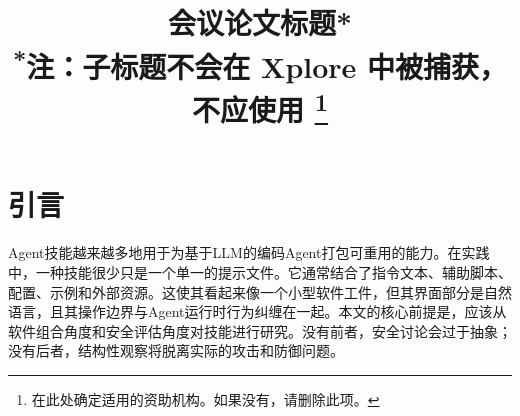 \documentclass[conference]{IEEEtran}
\begin{document}
\title{会议论文标题*\\
{\footnotesize \textsuperscript{*}注：子标题不会在 Xplore 中被捕获，不应使用}
\thanks{在此处确定适用的资助机构。如果没有，请删除此项。}
}

\author{
\and
{}
\and
{}
\and
{}
\and
{}
\and
{}
}

\maketitle

\begin{abstract}
\end{abstract}

\begin{IEEEkeywords}
\end{IEEEkeywords}

\section{引言}

Agent技能越来越多地用于为基于LLM的编码Agent打包可重用的能力。在实践中，一种技能很少只是一个单一的提示文件。它通常结合了指令文本、辅助脚本、配置、示例和外部资源。这使其看起来像一个小型软件工件，但其界面部分是自然语言，且其操作边界与Agent运行时行为纠缠在一起。本文的核心前提是，应该从软件组合角度和安全评估角度对技能进行研究。没有前者，安全讨论会过于抽象；没有后者，结构性观察将脱离实际的攻击和防御问题。
\end{document}
